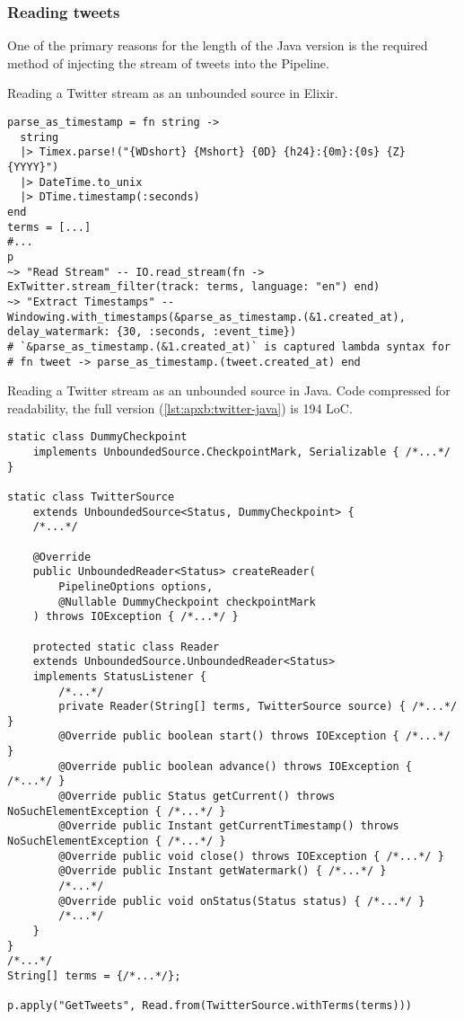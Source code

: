 \subsubsection{Reading tweets}

One of the primary reasons for the length of the Java version is the required method of injecting the stream of tweets into the Pipeline.

\begin{codelisting}
	\caption{Reading a Twitter stream as an unbounded source in Elixir.}
	\label{lst:eval:twitter-readstream-elixir}
	\begin{verbatim}
parse_as_timestamp = fn string ->
  string
  |> Timex.parse!("{WDshort} {Mshort} {0D} {h24}:{0m}:{0s} {Z} {YYYY}")
  |> DateTime.to_unix
  |> DTime.timestamp(:seconds)
end
terms = [...]
#...
p
~> "Read Stream" -- IO.read_stream(fn -> ExTwitter.stream_filter(track: terms, language: "en") end)
~> "Extract Timestamps" -- Windowing.with_timestamps(&parse_as_timestamp.(&1.created_at), delay_watermark: {30, :seconds, :event_time})
# `&parse_as_timestamp.(&1.created_at)` is captured lambda syntax for
# fn tweet -> parse_as_timestamp.(tweet.created_at) end
	\end{verbatim}
\end{codelisting}

\begin{codelisting}
	\caption[Reading a Twitter stream as an unbounded source in Java.]{Reading a Twitter stream as an unbounded source in Java. Code compressed for readability, the full version (\cref{lst:apxb:twitter-java}) is 194 LoC.}
	\label{lst:eval:twitter-readstream-java}
	\begin{verbatim}
static class DummyCheckpoint
    implements UnboundedSource.CheckpointMark, Serializable { /*...*/ }
    
static class TwitterSource
    extends UnboundedSource<Status, DummyCheckpoint> {
    /*...*/
        
    @Override
    public UnboundedReader<Status> createReader(
        PipelineOptions options,
        @Nullable DummyCheckpoint checkpointMark
    ) throws IOException { /*...*/ }

    protected static class Reader
    extends UnboundedSource.UnboundedReader<Status>
    implements StatusListener {
        /*...*/
        private Reader(String[] terms, TwitterSource source) { /*...*/ }
        @Override public boolean start() throws IOException { /*...*/ }
        @Override public boolean advance() throws IOException { /*...*/ }
        @Override public Status getCurrent() throws NoSuchElementException { /*...*/ }
        @Override public Instant getCurrentTimestamp() throws NoSuchElementException { /*...*/ }
        @Override public void close() throws IOException { /*...*/ }
        @Override public Instant getWatermark() { /*...*/ }
        /*...*/
        @Override public void onStatus(Status status) { /*...*/ }
        /*...*/
    }
}
/*...*/
String[] terms = {/*...*/};

p.apply("GetTweets", Read.from(TwitterSource.withTerms(terms)))
	\end{verbatim}
\end{codelisting}

